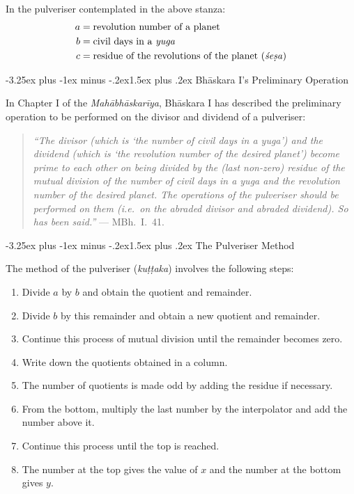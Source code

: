 \documentclass[11pt,a4paper]{article}
\makeatletter
\renewcommand{\subsection}{\@startsection{subsection}{2}{\z@}%
  {-3.25ex plus -1ex minus -.2ex}{1.5ex plus .2ex}%
  {\normalfont\large\bfseries\color{sectioncolor}}}
\makeatother
\begin{document}
In the pulveriser contemplated in the above stanza:
\begin{align*}
a &= \text{revolution number of a planet} \\
b &= \text{civil days in a \textit{yuga}} \\
c &= \text{residue of the revolutions of the planet (\textit{śeṣa})}
\end{align*}

\subsection{Bhāskara I's Preliminary Operation}

In Chapter I of the \textit{Mahābhāskarīya}, Bhāskara I has described the preliminary operation to be performed on the divisor and dividend of a pulveriser:

\begin{quote}
\textit{``The divisor (which is `the number of civil days in a \textit{yuga}') and the dividend (which is `the revolution number of the desired planet') become prime to each other on being divided by the (last non-zero) residue of the mutual division of the number of civil days in a \textit{yuga} and the revolution number of the desired planet. The operations of the pulveriser should be performed on them (i.e.\ on the abraded divisor and abraded dividend). So has been said.''} --- MBh.\ I.\ 41.
\end{quote}

\subsection{The Pulveriser Method}

The method of the pulveriser (\textit{kuṭṭaka}) involves the following steps:

\begin{enumerate}[label=\arabic*.]
\item Divide $a$ by $b$ and obtain the quotient and remainder.
\item Divide $b$ by this remainder and obtain a new quotient and remainder.
\item Continue this process of mutual division until the remainder becomes zero.
\item Write down the quotients obtained in a column.
\item The number of quotients is made odd by adding the residue if necessary.
\item From the bottom, multiply the last number by the interpolator and add the number above it.
\item Continue this process until the top is reached.
\item The number at the top gives the value of $x$ and the number at the bottom gives $y$.
\end{enumerate}
\end{document}
